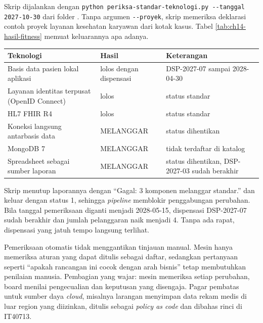 \begin{pendalaman}
Skrip dijalankan dengan \texttt{python periksa-standar-teknologi.py
-{}-tanggal 2027-10-30} dari folder . Tanpa
argumen \texttt{-{}-proyek}, skrip memeriksa deklarasi contoh proyek layanan
kesehatan karyawan dari kotak kasus. Tabel \ref{tab:ch14-hasil-fitness}
memuat keluarannya apa adanya.

\begin{center}
  \label{tab:ch14-hasil-fitness}
  \small
  \begin{tabularx}{\linewidth}{>{\raggedright\arraybackslash}X>{\raggedright\arraybackslash}p{2.3cm}>{\raggedright\arraybackslash}p{3.3cm}}
    \hline
    \textbf{Teknologi} & \textbf{Hasil} & \textbf{Keterangan} \\
    \hline
    Basis data pasien lokal aplikasi & lolos dengan dispensasi & DSP-2027-07
      sampai 2028-04-30 \\
    \hline
    Layanan identitas terpusat (OpenID Connect) & lolos & status standar \\
    \hline
    HL7 FHIR R4 & lolos & status standar \\
    \hline
    Koneksi langsung antarbasis data & MELANGGAR & status dihentikan \\
    \hline
    MongoDB 7 & MELANGGAR & tidak terdaftar di katalog \\
    \hline
    Spreadsheet sebagai sumber laporan & MELANGGAR & status dihentikan,
      DSP-2027-03 sudah berakhir \\
    \hline
  \end{tabularx}
\end{center}

Skrip menutup laporannya dengan ``Gagal: 3 komponen melanggar standar.''
dan keluar dengan status 1, sehingga \textit{pipeline} memblokir
penggabungan perubahan. Bila tanggal pemeriksaan diganti menjadi
2028-05-15, dispensasi DSP-2027-07 sudah berakhir dan jumlah pelanggaran
naik menjadi 4. Tanpa ada rapat, dispensasi yang jatuh tempo langsung
terlihat.

Pemeriksaan otomatis tidak menggantikan tinjauan manual. Mesin hanya
memeriksa aturan yang dapat ditulis sebagai daftar, sedangkan pertanyaan
seperti ``apakah rancangan ini cocok dengan arah bisnis'' tetap membutuhkan
penilaian manusia. Pembagian yang wajar: mesin memeriksa setiap perubahan,
board menilai pengecualian dan keputusan yang disengaja. Pagar pembatas
untuk sumber daya \textit{cloud}, misalnya larangan menyimpan data rekam
medis di luar region yang diizinkan, ditulis sebagai \textit{policy as code}
dan dibahas rinci di IT40713.
\end{pendalaman}


